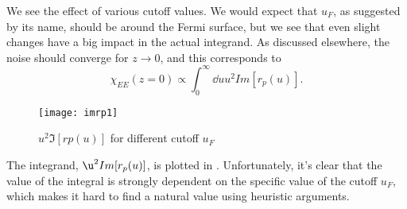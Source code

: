 \documentclass[11pt]{article}
\begin{document}
	We see  the effect of various cutoff values.
	We would expect that $u_F$, as suggested by its name, should be around the Fermi surface, but we see that even slight changes have a big impact in the actual integrand.
	As discussed elsewhere, the noise should converge for $z\rightarrow 0$, and this corresponds to
	\begin{equation}
		\chi_{EE}(z = 0) \propto \int_0^\infty \dd{u} u^2 Im[r_p(u)].
	\end{equation}

	\begin{figure}[htp]
		\centering
		\texttt{[image: imrp1]}
		\caption{$u^2 \Im[rp(u)]$ for different cutoff $u_F$} \label{fig:u2imrpVsCutoff}
	\end{figure}
	The integrand, $\u^2 Im[r_p(u)]$, is plotted in .
	Unfortunately, it's clear that the value of the integral is strongly dependent on the specific value of the cutoff $u_F$, which makes it hard to find a natural value using heuristic arguments.


	\newpage
	\listoftodos
	\newpage
	\printbibliography
\end{document}
